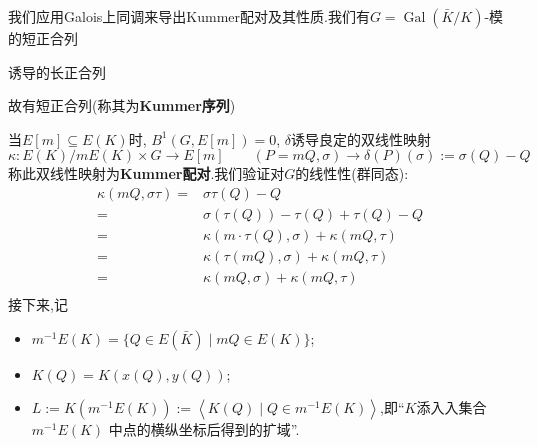 \documentclass[12pt,A4paper,oneside,reqno]{amsart}
\numberwithin{equation}{section}
\theoremstyle{definition}
\theoremstyle{plain}
\theoremstyle{plain}
\numberwithin{equation}{section}
\theoremstyle{remark}
\newcommand{\Gal}{\operatorname{Gal}}
\begin{document}
我们应用Galois上同调来导出Kummer配对及其性质.我们有$G=\Gal(\bar{K}/K)$-模的短正合列
	\begin{center}
	\end{center}
诱导的长正合列
	\begin{center}
	\end{center}
故有短正合列(称其为\textbf{Kummer序列})
	\begin{center}
	\end{center}
当$E[m] \subseteq E(K)$时, $B^1(G,E[m])=0$, $\delta$诱导良定的双线性映射
$$ \kappa : E(K)/mE(K) \times G \longrightarrow E[m] \qquad (P\!\!=\!\!mQ, \sigma) \longrightarrow \delta(P)(\sigma):=\sigma(Q)-Q$$
称此双线性映射为\textbf{Kummer配对}.我们验证对$G$的线性性(群同态):
\begin{equation*}
\begin{aligned}
\kappa(mQ,\sigma\tau)=&\sigma\tau(Q)-Q\\
=& \sigma(\tau(Q))-\tau(Q)+\tau(Q)-Q\\
=& \kappa(m \cdot\tau(Q),\sigma)+\kappa(mQ, \tau)\\
=& \kappa(\tau(mQ),\sigma)+\kappa(mQ, \tau)\\
=& \kappa(mQ,\sigma)+\kappa(mQ, \tau)\\
\end{aligned}
\end{equation*}
接下来,记
\begin{itemize}
	\item $m^{-1}E(K)=\{Q \in E(\bar{K}) \mid mQ \in E(K)\}$;
	\item $K(Q)=K(x(Q),y(Q))$;
	\item $L:=K(m^{-1}E(K)):=\left<K(Q) \mid Q \in m^{-1}E(K) \right>$,即“$K$添入入集合 $m^{-1}E(K)$ 中点的横纵坐标后得到的扩域”.
\end{itemize}
\end{document}
